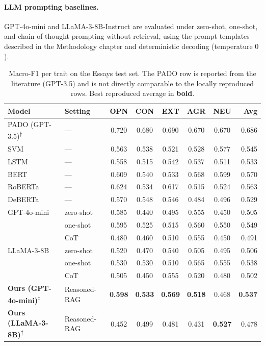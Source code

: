 \documentclass[../main.tex]{subfiles}
\begin{document}
\paragraph{LLM prompting baselines.}
GPT-4o-mini and LLaMA-3-8B-Instruct are evaluated under zero-shot, one-shot,
and chain-of-thought prompting without retrieval, using the prompt templates
described in the Methodology chapter and deterministic decoding (temperature
$0$).

\begin{table}[htbp]
  \centering
  \caption{Macro-F1 per trait on the Essays test set. The PADO row is
    reported from the literature (GPT-3.5) and is not directly comparable to the
    locally reproduced rows. Best reproduced average in \textbf{bold}.}
  \label{tab:baselines}
  \small
  \begin{tabular}{llcccccr}
    \toprule
    \textbf{Model} & \textbf{Setting} & \textbf{OPN} & \textbf{CON}
      & \textbf{EXT} & \textbf{AGR} & \textbf{NEU} & \textbf{Avg} \\
    \midrule
    PADO (GPT-3.5)\textsuperscript{$\dagger$} & ---       & 0.720 & 0.680 & 0.690 & 0.670 & 0.670 & 0.686 \\
    \midrule
    SVM        & ---       & 0.563 & 0.538 & 0.521 & 0.528 & 0.577 & 0.545 \\
    LSTM       & ---       & 0.558 & 0.515 & 0.542 & 0.537 & 0.511 & 0.533 \\
    BERT       & ---       & 0.609 & 0.540 & 0.533 & 0.568 & 0.599 & 0.570 \\
    RoBERTa    & ---       & 0.624 & 0.534 & 0.617 & 0.515 & 0.524 & 0.563 \\
    DeBERTa    & ---       & 0.570 & 0.548 & 0.546 & 0.484 & 0.496 & 0.529 \\
    \midrule
    GPT-4o-mini & zero-shot & 0.585 & 0.440 & 0.495 & 0.555 & 0.450 & 0.505 \\
                & one-shot  & 0.595 & 0.525 & 0.515 & 0.560 & 0.550 & 0.549 \\
                & CoT       & 0.480 & 0.460 & 0.510 & 0.555 & 0.450 & 0.491 \\
    \midrule
    LLaMA-3-8B  & zero-shot & 0.520 & 0.470 & 0.540 & 0.505 & 0.495 & 0.506 \\
                & one-shot  & 0.530 & 0.530 & 0.510 & 0.565 & 0.555 & 0.538 \\
                & CoT       & 0.505 & 0.450 & 0.555 & 0.520 & 0.480 & 0.502 \\
    \midrule
    \textbf{Ours (GPT-4o-mini)}\textsuperscript{$\ddagger$} & Reasoned-RAG & \textbf{0.598} & \textbf{0.533} & \textbf{0.569} & \textbf{0.518} & 0.468 & \textbf{0.537} \\
    \textbf{Ours (LLaMA-3-8B)}\textsuperscript{$\ddagger$}  & Reasoned-RAG & 0.452 & 0.499 & 0.481 & 0.431 & \textbf{0.527} & 0.478 \\
    \bottomrule
  \end{tabular}
\end{table}
\end{document}
